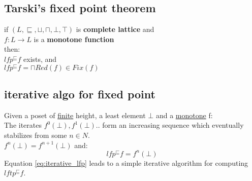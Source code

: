 \subsection{Tarski's fixed point theorem}
\label{Tarski}
if $(L,\sqsubseteq,\sqcup,\sqcap,\bot,\top)$ is \textbf{complete lattice} and \\ $f: L \to L$ is a \textbf{monotone function} \\
then: \\
$lfp^{\sqsubseteq}f$ exists, and \\
$lfp^{\sqsubseteq}f = \sqcap Red(f) \in Fix(f)$

\subsection{iterative algo for fixed point}
\label{fixedpoint_theorem}
Given a poset of \underline{finite} height, a least element $\bot$ and a \underline{monotone} f:\\
The iterates $f^0(\bot), f^1(\bot)..$ form an increasing sequence which eventually stabilizes from some $n \in N$. \\
$f^n(\bot) = f^{n+1}(\bot)$ and: \\
\begin{equation}
\label{eq:iterative_lfp}
lfp^{\sqsubseteq}f = f^n(\bot)
\end{equation}
Equation \ref{eq:iterative_lfp} leads to a simple iterative algorithm for computing $lftp^{\sqsubseteq}f$.

